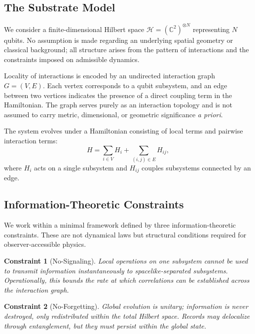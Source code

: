 \documentclass[11pt]{article}
\newtheorem{constraint}{Constraint}
\begin{document}
\subsection{The Substrate Model}

We consider a finite-dimensional Hilbert space $\mathcal{H} = (\mathbb{C}^2)^{\otimes N}$ representing $N$ qubits. No assumption is made regarding an underlying spatial geometry or classical background; all structure arises from the pattern of interactions and the constraints imposed on admissible dynamics.

Locality of interactions is encoded by an undirected interaction graph $G = (V, E)$. Each vertex corresponds to a qubit subsystem, and an edge between two vertices indicates the presence of a direct coupling term in the Hamiltonian. The graph serves purely as an interaction topology and is not assumed to carry metric, dimensional, or geometric significance \emph{a priori}.

The system evolves under a Hamiltonian consisting of local terms and pairwise interaction terms:
\begin{equation}
H = \sum_{i \in V} H_i + \sum_{(i,j) \in E} H_{ij},
\end{equation}
where $H_i$ acts on a single subsystem and $H_{ij}$ couples subsystems connected by an edge.

\subsection{Information-Theoretic Constraints}

We work within a minimal framework defined by three information-theoretic constraints. These are not dynamical laws but structural conditions required for observer-accessible physics.

\begin{constraint}[No-Signaling]
Local operations on one subsystem cannot be used to transmit information instantaneously to spacelike-separated subsystems. Operationally, this bounds the rate at which correlations can be established across the interaction graph.
\end{constraint}

\begin{constraint}[No-Forgetting]
Global evolution is unitary; information is never destroyed, only redistributed within the total Hilbert space. Records may delocalize through entanglement, but they must persist within the global state.
\end{constraint}
\end{document}

